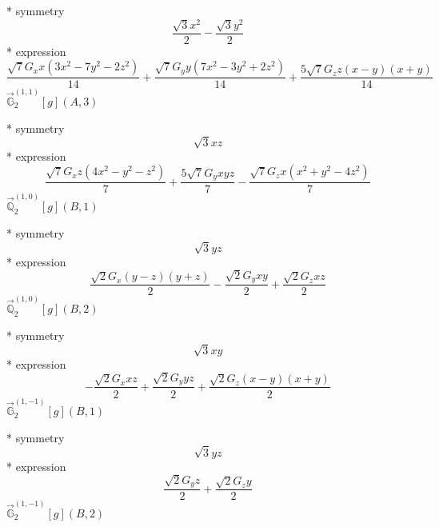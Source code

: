 \documentclass[fleqn,8pt]{jsarticle}
\begin{document}
\noindent\quad ** symmetry
\begin{dmath*}
\frac{\sqrt{3} x^{2}}{2} - \frac{\sqrt{3} y^{2}}{2}
\end{dmath*}
\noindent\quad ** expression
\begin{dmath*}
\frac{\sqrt{7} G_{x} x \left(3 x^{2} - 7 y^{2} - 2 z^{2}\right)}{14} + \frac{\sqrt{7} G_{y} y \left(7 x^{2} - 3 y^{2} + 2 z^{2}\right)}{14} + \frac{5 \sqrt{7} G_{z} z \left(x - y\right) \left(x + y\right)}{14}
\end{dmath*}
\noindent\quad $\vec{\mathbb{G}}_{2}^{(1,1)}[g](A,3)$

\noindent\quad ** symmetry
\begin{dmath*}
\sqrt{3} x z
\end{dmath*}
\noindent\quad ** expression
\begin{dmath*}
\frac{\sqrt{7} G_{x} z \left(4 x^{2} - y^{2} - z^{2}\right)}{7} + \frac{5 \sqrt{7} G_{y} x y z}{7} - \frac{\sqrt{7} G_{z} x \left(x^{2} + y^{2} - 4 z^{2}\right)}{7}
\end{dmath*}
\noindent\quad $\vec{\mathbb{Q}}_{2}^{(1,0)}[g](B,1)$

\noindent\quad ** symmetry
\begin{dmath*}
\sqrt{3} y z
\end{dmath*}
\noindent\quad ** expression
\begin{dmath*}
\frac{\sqrt{2} G_{x} \left(y - z\right) \left(y + z\right)}{2} - \frac{\sqrt{2} G_{y} x y}{2} + \frac{\sqrt{2} G_{z} x z}{2}
\end{dmath*}
\noindent\quad $\vec{\mathbb{Q}}_{2}^{(1,0)}[g](B,2)$

\noindent\quad ** symmetry
\begin{dmath*}
\sqrt{3} x y
\end{dmath*}
\noindent\quad ** expression
\begin{dmath*}
- \frac{\sqrt{2} G_{x} x z}{2} + \frac{\sqrt{2} G_{y} y z}{2} + \frac{\sqrt{2} G_{z} \left(x - y\right) \left(x + y\right)}{2}
\end{dmath*}
\noindent\quad $\vec{\mathbb{G}}_{2}^{(1,-1)}[g](B,1)$

\noindent\quad ** symmetry
\begin{dmath*}
\sqrt{3} y z
\end{dmath*}
\noindent\quad ** expression
\begin{dmath*}
\frac{\sqrt{2} G_{y} z}{2} + \frac{\sqrt{2} G_{z} y}{2}
\end{dmath*}
\noindent\quad $\vec{\mathbb{G}}_{2}^{(1,-1)}[g](B,2)$
\end{document}
